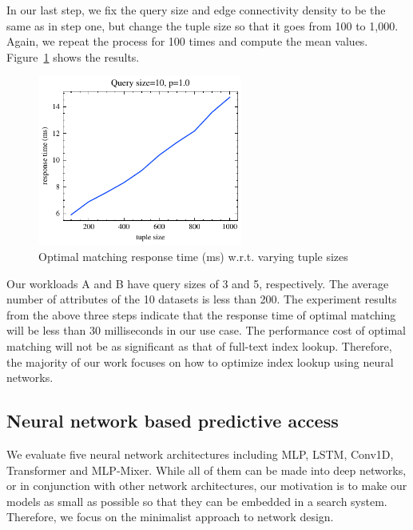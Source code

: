 In our last step, we fix the query size and edge connectivity density to be the same as in step one, but change the tuple size so that it goes from 100 to 1,000. Again, we repeat the process for 100 times and compute the mean values. Figure~\ref{fig:tuple_completion_3} shows the results.
\begin{figure}[!th]
	\centering
	\includegraphics[width=0.6\textwidth]{my/graphics/tuple_completion_3.pdf}
	\caption{Optimal matching response time (ms) w.r.t. varying tuple sizes}
	\label{fig:tuple_completion_3}
\end{figure}

Our workloads A and B have query sizes of 3 and 5, respectively. The average number of attributes of the 10 datasets is less than 200. 
The experiment results from the above three steps indicate that the response time of optimal matching will be less than 30 milliseconds in our use case. 
The performance cost of optimal matching will not be as significant as that of full-text index lookup. 
Therefore, the majority of our work focuses on how to optimize index lookup using neural networks.

\subsection{Neural network based predictive access}
\label{subsection:nn_experiments}

We evaluate five neural network architectures including MLP, LSTM, Conv1D, Transformer and MLP-Mixer. While all of them can be made into deep networks, or in conjunction with other network architectures, our motivation is to make our models as small as possible so that they can be embedded in a search system.
Therefore, we focus on the minimalist approach to network design.

